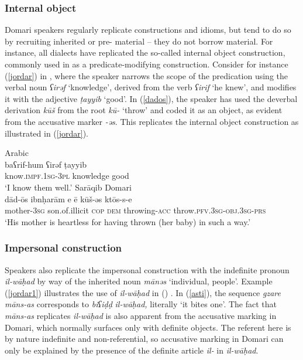 \documentclass[output=paper]{langsci/langscibook}
\begin{document}
 \subsubsection{Internal object}

Domari speakers regularly replicate  constructions and {idioms}, but tend to do so by recruiting inherited or pre- material -- they do not borrow  material. For instance, all dialects have replicated the so-called {internal object} construction, commonly used in  as a predicate-modifying construction. Consider for instance (\ref{jordar}) in  , where the speaker narrows the scope of the predication using the verbal noun \textit{ʕirəf} ‘knowledge’, derived from the verb \textit{ʕirif} ‘he knew’, and modifies it with the adjective \textit{ṭayyib} ‘good’. In (\ref{dados}), the speaker has used the deverbal {derivation} \textit{kūš} from the {root} \textit{kū-} ‘throw’ and coded it as an object, as evident from the accusative marker \textit{-əs}. This replicates the  {internal object} construction as illustrated in (\ref{jordar}).

\ea
{ Arabic}\\ \label{jordar}
\gll baʕrif-hum ʕirəf ṭayyib\\
     know.\textsc{impf.1sg-3pl} knowledge good\\
\glt ‘I know them well.’
\ex \label{dados}
{Sarāqib Domari}\\
\gll dād-ōs ibnḥarām e ē kūš-əs ktōs-s-e\\
     mother-\textsc{3sg} son.of.illicit \textsc{cop} \textsc{dem} throwing-\textsc{acc} throw.\textsc{pfv.3sg-obj.3sg-prs}\\
\glt ‘His mother is heartless for having thrown (her baby) in such a way.’
\z

 \subsubsection{Impersonal construction}

Speakers also replicate the  {impersonal construction} with the indefinite pronoun \textit{il-wāḥad} by way of the inherited noun \textit{mānəs} ‘individual, people’. Example (\ref{jordar1}) illustrates the use of \textit{il-wāḥad} in () . In (\ref{asti}), the sequence \textit{gzare} \textit{māns-as} corresponds to  \textit{biʕiḍḍ} \textit{il-wāḥad,} literally ‘it bites one’. The fact that \textit{māns-as} replicates \textit{il-wāḥad} is also apparent from the accusative marking in Domari, which normally surfaces only with {definite} objects. The referent here is by nature indefinite and non-referential, so accusative marking in Domari can only be explained by the presence of the {definite} {article} \textit{il-} in  \textit{il-wāḥad}.
\end{document}
